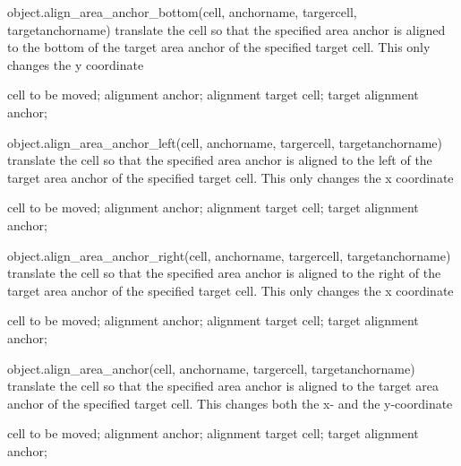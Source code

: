 \begin{APIfunc}{object.align\_area\_anchor\_bottom(cell, anchorname, targercell, targetanchorname)}
    translate the cell so that the specified area anchor is aligned to the bottom of the target area anchor of the specified target cell. This only changes the y coordinate
    \begin{APIparameters}
            cell to be moved;
            alignment anchor;
            alignment target cell;
            target alignment anchor;
    \end{APIparameters}
\end{APIfunc}
\begin{APIfunc}{object.align\_area\_anchor\_left(cell, anchorname, targercell, targetanchorname)}
    translate the cell so that the specified area anchor is aligned to the left of the target area anchor of the specified target cell. This only changes the x coordinate
    \begin{APIparameters}
            cell to be moved;
            alignment anchor;
            alignment target cell;
            target alignment anchor;
    \end{APIparameters}
\end{APIfunc}
\begin{APIfunc}{object.align\_area\_anchor\_right(cell, anchorname, targercell, targetanchorname)}
    translate the cell so that the specified area anchor is aligned to the right of the target area anchor of the specified target cell. This only changes the x coordinate
    \begin{APIparameters}
            cell to be moved;
            alignment anchor;
            alignment target cell;
            target alignment anchor;
    \end{APIparameters}
\end{APIfunc}
\begin{APIfunc}{object.align\_area\_anchor(cell, anchorname, targercell, targetanchorname)}
    translate the cell so that the specified area anchor is aligned to the target area anchor of the specified target cell. This changes both the x- and the y-coordinate
    \begin{APIparameters}
            cell to be moved;
            alignment anchor;
            alignment target cell;
            target alignment anchor;
    \end{APIparameters}
\end{APIfunc}
